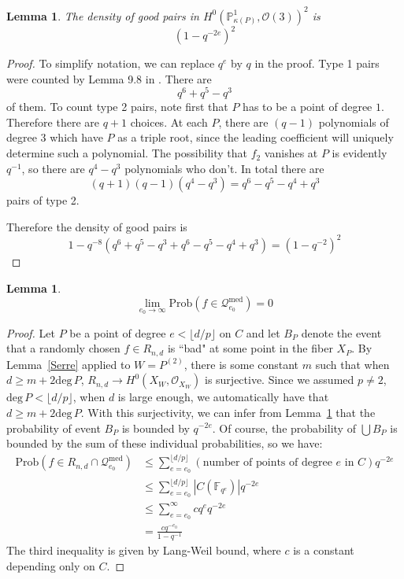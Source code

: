 \documentclass[12pt]{article}
\theoremstyle{plain}
\newtheorem{lemma}[equation]{Lemma}
\theoremstyle{definition}
\newcommand{\IF}{\mathbb{F}}
\newcommand{\IP}{\mathbb{P}}
\newcommand{\sO}{\mathcal{O}}
\newcommand{\sQ}{\mathcal{Q}}
\renewcommand{\deg}{\mathrm{deg}\,}
\newcommand\union{\bigcup}
\newcommand{\<}{\langle}
\renewcommand{\>}{\rangle}
\newcommand{\Prob}{\mathrm{Prob}}
\begin{document}
\begin{lemma}
\label{count}
The density of good pairs in $H^0(\IP^1_{\kappa(P)}, \sO(3))^2$ is 
$$ (1 - q^{-2e})^{2} $$
\end{lemma}
\begin{proof}
To simplify notation, we can replace $q^e$ by $q$ in the proof. Type 1 pairs were counted by Lemma 9.8 in \cite{Wood}. There are 
$$ q^6 + q^5 - q^3 $$
of them. 
To count type 2 pairs, note first that $P$ has to be a point of degree $1$. Therefore there are $q + 1$ choices. At each $P$, there are $(q-1)$ polynomials of degree $3$ which have $P$ as a triple root, since the leading coefficient will uniquely determine such a polynomial. The possibility that $f_2$ vanishes at $P$ is evidently $q^{-1}$, so there are $q^4 - q^3$ polynomials who don't. In total there are 
$$ (q + 1)(q - 1)(q^4 - q^3) = q^6 - q^5 - q^4 + q^3 $$
pairs of type 2. 

Therefore the density of good pairs is 
$$ 1 - q^{-8}(q^6 + q^5 - q^3 + q^6 - q^5 - q^4 + q^3) = (1 - q^{-2})^2 $$ 
\end{proof}


\begin{lemma}
\label{Medium}
$$\lim_{e_0 \to \infty} \Prob( f \in  \sQ_{e_0}^{\mathrm{med}}) = 0 $$
\end{lemma}
\begin{proof}
Let $P$ be a point of degree $e < \lfloor d/p \rfloor$ on $C$ and let $B_P$ denote the event that a randomly chosen $f \in R_{n, d}$ is ``bad" at some point in the fiber $X_P$. By Lemma~\ref{Serre} applied to $W = P^{(2)}$, there is some constant $m$ such that when $d \ge m + 2 \deg P$, $R_{n, d} \to H^0(X_W, \sO_{X_W})$ is surjective. Since we assumed $p \neq 2$, $\deg P < \lfloor d/p \rfloor$, when $d$ is large enough, we automatically have that $d \ge m + 2 \deg P$. With this surjectivity, we can infer from Lemma~\ref{count} that the probability of event $B_P$ is bounded by $q^{-2e}$. Of course, the probability of $\union B_P$ is bounded by the sum of these individual probabilities, so we have:
\begin{align*}
\Prob(f \in R_{n, d} \cap \sQ_{e_0}^{\mathrm{med}}) &\le \sum_{e = e_0}^{\lfloor d/p \rfloor} (\text{number of points of degree $e$ in $C$})q^{-2e} \\
&\le \sum_{e = e_0}^{\lfloor d/p \rfloor}|C(\IF_{q^e})| q^{-2e} \\
&\le \sum_{e = e_0}^{\infty} c q^{e} q^{-2e} \\
&= \frac{c q^{-e_0}}{1 - q^{-1}}
\end{align*}
The third inequality is given by Lang-Weil bound, where $c$ is a constant depending only on $C$. 
\end{proof}
\end{document}
